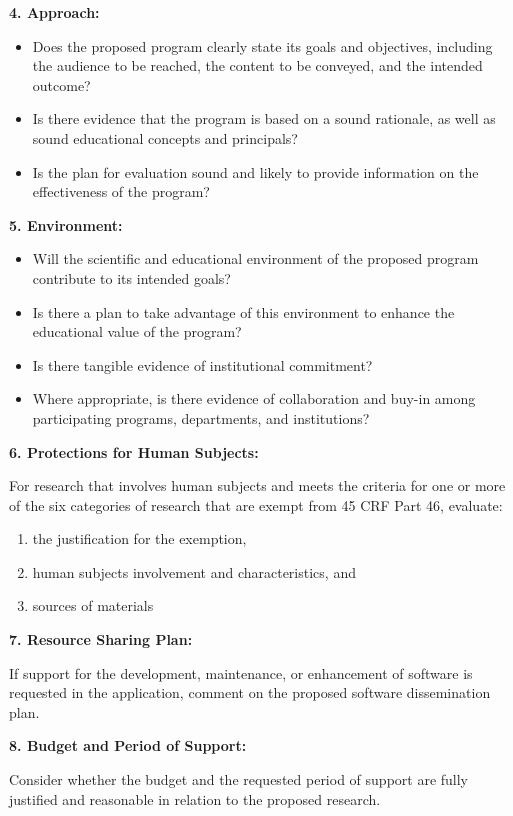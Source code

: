 \documentclass[pdftex,english,11pt,parskip=half]{scrartcl}
\begin{document}
\textbf{4. Approach:}

\begin{itemize}
\item Does the proposed program clearly state its goals and objectives, including the audience to be reached, the content to be conveyed, and the intended outcome?
\item Is there evidence that the program is based on a sound rationale, as well as sound educational concepts and principals?
\item Is the plan for evaluation sound and likely to provide information on the effectiveness of the program?
\end{itemize}

\textbf{5. Environment:}

\begin{itemize}
\item Will the scientific and educational environment of the proposed program contribute to its intended goals?
\item Is there a plan to take advantage of this environment to enhance the educational value of the program?
\item Is there tangible evidence of institutional commitment?
\item Where appropriate, is there evidence of collaboration and buy-in among participating programs, departments, and institutions?
\end{itemize}

\textbf{6. Protections for Human Subjects:}

For research that involves human subjects and meets the criteria for one or more of the six categories of research that are exempt from 45 CRF Part 46, evaluate:

\begin{enumerate}
\item the justification for the exemption,
\item human subjects involvement and characteristics, and
\item sources of materials
\end{enumerate}

\textbf{7. Resource Sharing Plan:}

If support for the development, maintenance, or enhancement of software is requested in the application, comment on the proposed software dissemination plan.

\textbf{8. Budget and Period of Support:}

Consider whether the budget and the requested period of support are fully justified and reasonable in relation to the proposed research.
\end{document}
